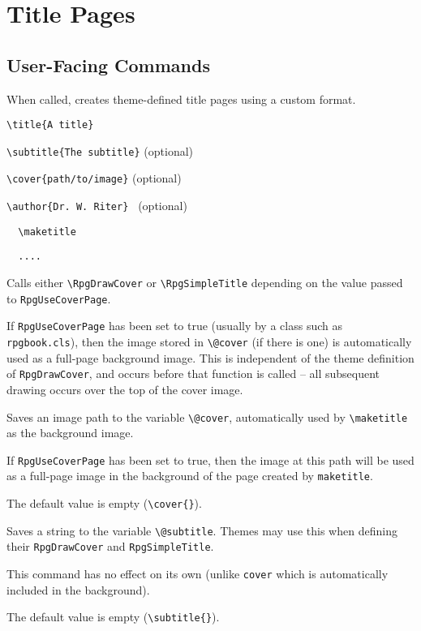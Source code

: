 	\section{Title Pages}
		\subsection{User-Facing Commands}
			\begin{macrolist}
				\RpgMacro*{\maketitle,{{}}}
					{	
						When called, creates theme-defined title pages using a custom format.
					}{
						\verb|\title{A title}|

						\verb|\subtitle{The subtitle}| (optional)
						
						\verb|\cover{path/to/image}| (optional)
						
						\verb|\author{Dr. W. Riter} | (optional)
						
						\verb||
						
						\verb|	\maketitle|
						
						\verb|	....|
						
						\verb||
					}{
						Calls either \verb|\RpgDrawCover| or \verb|\RpgSimpleTitle| depending on the value passed to \verb|RpgUseCoverPage|.

						If \verb|RpgUseCoverPage| has been set to true (usually by a class such as \verb|rpgbook.cls|), then the image stored in \verb|\@cover| (if there is one) is automatically used as a full-page background image. This is independent of the theme definition of \verb|RpgDrawCover|, and occurs before that function is called -- all subsequent drawing occurs over the top of the cover image.
					}
					{
						Saves an image path to the variable \verb|\@cover|, automatically used by \verb|\maketitle| as the background image.
					}
					{
					}
					{
						If \verb|RpgUseCoverPage| has been set to true, then the image at this path will be used as a full-page image in the background of the page created by \verb|maketitle|.

						The default value is empty (\verb|\cover{}|).
					}
					{
						Saves a string to the variable \verb|\@subtitle|. Themes may use this when defining their \verb|RpgDrawCover| and \verb|RpgSimpleTitle|.
					}
					{
						\subtitle{<string>}
					}
					{
						This command has no effect on its own (unlike \verb|cover| which is automatically included in the background).

						The default value is empty (\verb|\subtitle{}|).
					}
			\end{macrolist}
